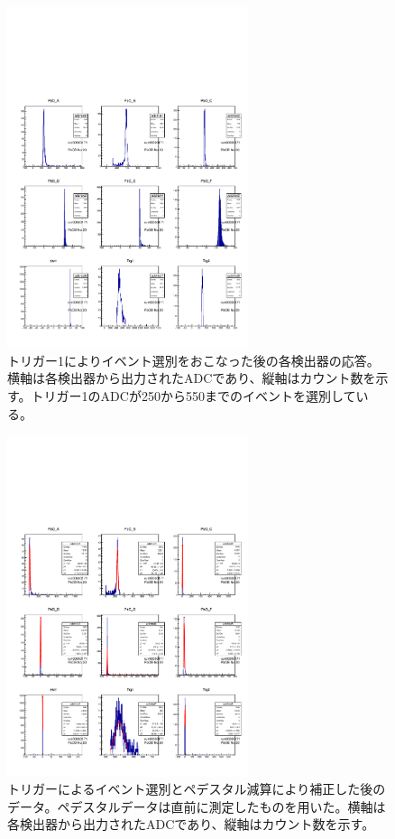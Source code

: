 \begin{figure}[H]
	\begin{center}
		\includegraphics[width=200pt]{./Figure/EBESAnalysis/TrgSelection.pdf}
		\caption[トリガーによりイベント選別をおこなった後の各検出器の応答]{トリガー1によりイベント選別をおこなった後の各検出器の応答。横軸は各検出器から出力されたADCであり、縦軸はカウント数を示す。トリガー1のADCが250から550までのイベントを選別している。}
		\label{TrgSelection}
	\end{center}
\end{figure}

\begin{figure}[H]
	\begin{center}
		\includegraphics[width=200pt]{./Figure/EBESAnalysis/CorrectBeam.pdf}
		\caption[トリガーによるイベント選別とペデスタル減算により補正した後のデータ]{トリガーによるイベント選別とペデスタル減算により補正した後のデータ。ペデスタルデータは直前に測定したものを用いた。横軸は各検出器から出力されたADCであり、縦軸はカウント数を示す。}
		\label{CorrectBeam}
	\end{center}
\end{figure}

